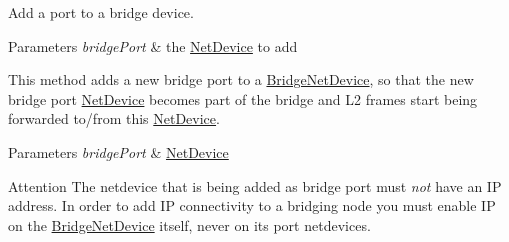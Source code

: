 Add a \textquotesingle{}port\textquotesingle{} to a bridge device. 


\begin{DoxyParams}{Parameters}
{\em bridge\+Port} & the \hyperlink{classns3_1_1NetDevice}{Net\+Device} to add\\
\hline
\end{DoxyParams}
This method adds a new bridge port to a \hyperlink{classns3_1_1BridgeNetDevice}{Bridge\+Net\+Device}, so that the new bridge port \hyperlink{classns3_1_1NetDevice}{Net\+Device} becomes part of the bridge and L2 frames start being forwarded to/from this \hyperlink{classns3_1_1NetDevice}{Net\+Device}.


\begin{DoxyParams}{Parameters}
{\em bridge\+Port} & \hyperlink{classns3_1_1NetDevice}{Net\+Device} \\
\hline
\end{DoxyParams}
\begin{DoxyAttention}{Attention}
The netdevice that is being added as bridge port must {\itshape not} have an IP address. In order to add IP connectivity to a bridging node you must enable IP on the \hyperlink{classns3_1_1BridgeNetDevice}{Bridge\+Net\+Device} itself, never on its port netdevices. 
\end{DoxyAttention}


